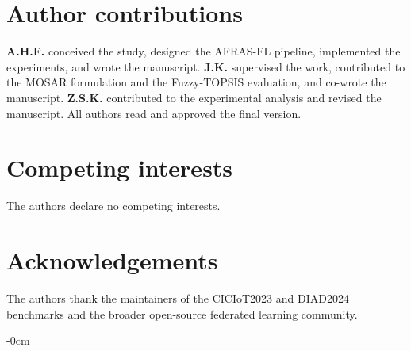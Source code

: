 \documentclass[ai,article,submit,moreauthors,pdftex]{Definitions/mdpi}
\begin{document}
\section*{Author contributions}
\textbf{A.H.F.} conceived the study, designed the AFRAS-FL
pipeline, implemented the experiments, and wrote the manuscript.
\textbf{J.K.} supervised the work, contributed to the MOSAR
formulation and the Fuzzy-TOPSIS evaluation, and co-wrote the
manuscript. \textbf{Z.S.K.} contributed to the experimental analysis
and revised the manuscript. All authors read and approved the final
version.

\section*{Competing interests}
The authors declare no competing interests.

\section*{Acknowledgements}
The authors thank the maintainers of the CICIoT2023 and DIAD2024
benchmarks and the broader open-source federated learning community.




\FloatBarrier


\begin{adjustwidth}{-\extralength}{0cm}

\PublishersNote{}
\end{adjustwidth}
\end{document}
